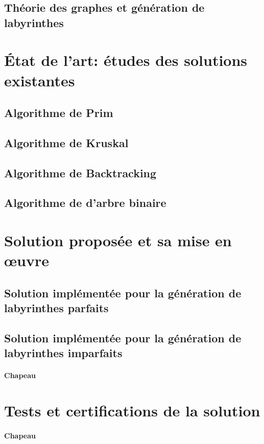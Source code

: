 \subsection{Théorie des graphes et génération de labyrinthes}



\section{État de l’art: études des solutions existantes} \label{sec:etatDeLart2}
\subsection{Algorithme de Prim}
\subsection{Algorithme de Kruskal}
\subsection{Algorithme de Backtracking}
\subsection{Algorithme de d'arbre binaire}




\section{Solution proposée et sa mise en œuvre} \label{sec:solution2}
\subsection{Solution implémentée pour la génération de labyrinthes parfaits}
\subsection{Solution implémentée pour la génération de labyrinthes imparfaits}
\paragraph{Chapeau}


\section{Tests et certifications de la solution} \label{sec:test2}

\paragraph{Chapeau}
